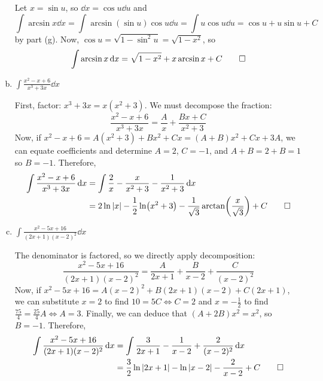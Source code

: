 \documentclass{agony}
\begin{document}
\begin{enumerate}[(a)]
        \begin{sol}
          Let $x = \sin u$, so $\dd{x} = \cos u \dd{u}$ and
          \begin{equation*}
            \int \arcsin x \dd{x}
            = \int \arcsin(\sin u) \cos u \dd{u}
            = \int u \cos u \dd{u}
            = \cos u + u\sin u + C
          \end{equation*}
          by part (g). Now, $\cos u = \sqrt{1-\sin^2 u} = \sqrt{1-x^2}$, so
          \[ \int \arcsin x \dd{x} = \sqrt{1-x^2} + x\arcsin x + C \qedhere \]
        \end{sol}
  \item $\displaystyle\int \frac{x^2 - x + 6}{x^3 + 3x} \dd{x}$
        \begin{sol}
          First, factor: $x^3 + 3x = x(x^2 + 3)$.
          We must decompose the fraction:
          \[ \frac{x^2 - x + 6}{x^3 + 3x} = \frac{A}{x} + \frac{Bx+C}{x^2 + 3} \]
          Now, if $x^2 - x + 6 = A(x^2 + 3) + Bx^2 +Cx = (A+B)x^2 + Cx + 3A$,
          we can equate coefficients and determine $A = 2$, $C = -1$,
          and $A+B = 2+B = 1$ so $B = -1$.
          Therefore,
          \begin{align*}
            \int \frac{x^2 - x + 6}{x^3 + 3x} \dd{x}
             & = \int \frac{2}{x} - \frac{x}{x^2+3} - \frac{1}{x^2+3} \dd{x}                             \\
             & = 2\ln\abs{x} - \frac{1}{2}\ln(x^2+3) - \frac{1}{\sqrt{3}}\arctan(\frac{x}{\sqrt{3}}) + C
            \qedhere
          \end{align*}
        \end{sol}
  \item $\displaystyle\int \frac{x^2 - 5x + 16}{(2x+1)(x-2)^2} \dd{x}$
        \begin{sol}
          The denominator is factored, so we directly apply decomposition:
          \[ \frac{x^2-5x+16}{(2x+1)(x-2)^2} = \frac{A}{2x+1}+\frac{B}{x-2}+\frac{C}{(x-2)^2} \]
          Now, if $x^2 - 5x + 16 = A(x-2)^2 + B(2x+1)(x-2) +  C(2x+1)$,
          we can substitute $x = 2$ to find $10 = 5C \iff C = 2$
          and $x = -\frac12$ to find $\frac{75}{4} = \frac{25}{4}A \iff A = 3$.
          Finally, we can deduce that $(A+2B)x^2 = x^2$, so $B = -1$. Therefore,
          \begin{align*}
            \int \frac{x^2 - 5x + 16}{(2x+1)(x-2)^2} \dd{x}
             & = \int \frac{3}{2x+1} - \frac{1}{x-2} + \frac{2}{(x-2)^2} \dd{x}       \\
             & = \frac{3}{2}\ln\abs{2x+1} - \ln\abs{x-2} - \frac{2}{x-2} + C \qedhere

\end{align*}
\end{sol}
\end{enumerate}
\end{document}
